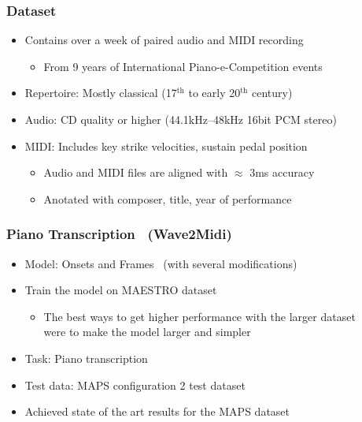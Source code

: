 \documentclass[dvipdfmx]{beamer}
\begin{document}
\begin{frame}
    \frametitle{Dataset}
    \begin{itemize}
        \item Contains over a week of paired audio and MIDI recording
        \begin{itemize}
            \item From 9 years of International Piano-e-Competition events
        \end{itemize}
        \item Repertoire: Mostly classical {\footnotesize (17$^{\mathrm{th}}$ to early 20$^{\mathrm{th}}$ century)}
    \end{itemize}
    \begin{itemize}
        \item Audio: CD quality or higher {\footnotesize (44.1kHz--48kHz 16bit PCM stereo)}
        \item MIDI: Includes key strike velocities, sustain pedal position
        \begin{itemize}
            \item Audio and MIDI files are aligned with $\approx$ 3ms accuracy
            \item Anotated with composer, title, year of performance
        \end{itemize}
    \end{itemize}
\end{frame}


\begin{frame}
    \frametitle{Piano Transcription \ (Wave2Midi)}
    \begin{itemize}
        \item Model: Onsets and Frames \cite{onsetandframes} \ {\small (with several modifications)}
        \item Train the model on MAESTRO dataset
        \begin{itemize}
            \item The best ways to get higher performance with the larger dataset \\
                were to make the model larger and simpler
        \end{itemize}
    \end{itemize}
    \begin{itemize}
        \item Task: Piano transcription
        \item Test data: MAPS configuration 2 test dataset
        \item Achieved state of the art results for the MAPS dataset
    \end{itemize}
\end{frame}
\end{document}
